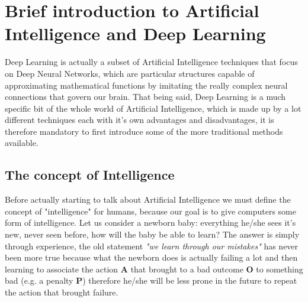 \documentclass[11pt,a4paper,titlepage]{book}
\begin{document}
\section{Brief introduction to Artificial Intelligence and Deep Learning}
Deep Learning is actually a subset of Artificial Intelligence techniques that focus on Deep Neural Networks, which are particular structures capable of approximating mathematical functions by imitating the really complex neural connections that govern our brain. That being said, Deep Learning is a much specific bit of the whole world of Artificial Intelligence, which is made up by a lot different techniques each with it's own advantages and disadvantages, it is therefore mandatory to first introduce some of the more traditional methods available.

\subsection{The concept of Intelligence}
Before actually starting to talk about Artificial Intelligence we must define the concept of "intelligence" for humans, because our goal is to give computers some form of intelligence. Let us consider a newborn baby: everything he/she sees it's new, never seen before, how will the baby be able to learn?
\newline
\newline
The answer is simply through experience, the old statement \textit{"we learn through our mistakes"} has never been more true because what the newborn does is actually failing a lot and then learning to associate the action \textbf{A} that brought to a bad outcome \textbf{O} to something bad (e.g. a penalty \textbf{P}) therefore he/she will be less prone in the future to repeat the action that brought failure.
\end{document}
